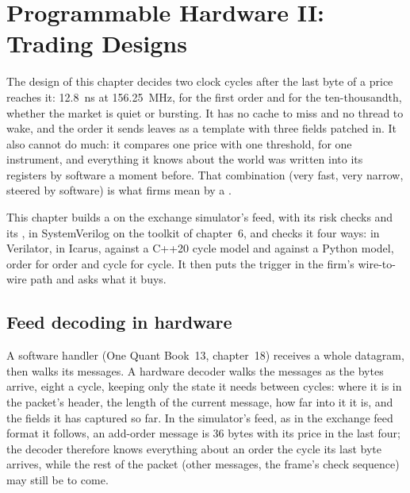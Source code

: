 \chapter{Programmable Hardware II: Trading Designs}\label{ch:nw:programmable-hardware-ii-trading-designs}

The design of this chapter decides two clock cycles after the last byte of a price reaches it: \qty{12.8}{\nano\second} at 156.25~MHz,
for the first order and for the ten-thousandth, whether the market is quiet or bursting. It has no cache to miss and no thread to wake,
and the order it sends leaves as a template with three fields patched in. It also cannot do much: it compares one price with one
threshold, for one instrument, and everything it knows about the world was written into its registers by software a moment before.
That combination (very fast, very narrow, steered by software) is what firms mean by a .

This chapter builds a  on the exchange simulator's feed, with its risk checks and its , in SystemVerilog
on the toolkit of chapter~6, and checks it four ways: in Verilator, in Icarus, against a C++20 cycle model and against a Python model,
order for order and cycle for cycle. It then puts the trigger in the firm's wire-to-wire path and asks what it buys.

\section{Feed decoding in hardware}

A software handler (One Quant Book~13, chapter~18) receives a whole datagram, then walks its messages. A hardware decoder walks the
messages as the bytes arrive, eight a cycle, keeping only the state it needs between cycles: where it is in the packet's header, the
length of the current message, how far into it it is, and the fields it has captured so far. In the simulator's feed, as in the
exchange feed format it follows, an add-order message is 36 bytes with its price in the last four; the decoder therefore knows everything
about an order the cycle its last byte arrives, while the rest of the packet (other messages, the frame's check sequence) may still be to
come.

\label{lst:nw:programmable-hardware-ii-trading-designs:parse}


